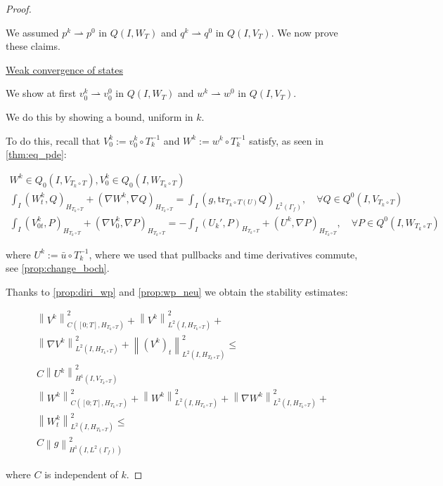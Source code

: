 \documentclass[english,a4paper,10pt,oneside]{scrbook}	%
\theoremstyle{break}
\newenvironment{mproof}[1][\proofname]{%
  \begin{proof}[#1]$ $\par\nobreak\ignorespaces
}{%
  \end{proof}
}
\renewcommand*{\proofname}{Proof}
\theoremstyle{remark}
\newcommand{\norm}[1]{\left\lVert#1\right\rVert}
\newcommand{\tr}{\text{tr}}
\newcommand{\weakc}{\rightharpoonup}
\begin{document}
\begin{mproof}
We assumed $p^k \weakc p^0$ in $Q(I,W_T)$ and $q^k \weakc q^0$ in $Q(I,V_T)$. We now prove these claims.

\underline{Weak convergence of states}

We show at first  $v_0^k \weakc v^0_0$ in $Q(I,W_T)$ and $w^k \weakc w^0$ in $Q(I,V_T)$.

We do this by showing a bound, uniform in $k$.

To do this, recall that $V_0^k:=v_0^k\circ T_k^{-1}$ and $W^k:=w^k\circ T_k^{-1}$ satisfy, as seen in \ref{thm:eq_pde}:

\begin{align*}
W^k \in Q_0(I, V_{T_k\circ T}), V_0^k \in Q_0(I,W_{T_k\circ T}) \\
\int_I  (W^k_t , Q)_{H_{T_k\circ T}}+ (\nabla W^k, \nabla Q)_{H_{T_k\circ T}} = \int_I(g,\tr_{{T_k\circ T}(U)} Q)_{L^2(\Gamma_f)}, \quad \forall Q \in Q^0(I, V_{T_k\circ T}) \\
\int_I (V^k_{0t},P)_{H_{T_k\circ T}} + (\nabla V_0^k, \nabla P)_{H_{T_k\circ T}}= -\int_I(U_k',P)_{H_{T_k\circ T}}+(U^k, \nabla P)_{H_{T_k\circ T}}, \quad \forall P \in Q^0(I, W_{T_k\circ T})
\end{align*}

where $U^k:=\bar{u}\circ T_k^{-1}$, where we used that pullbacks and time derivatives commute, see \cref{prop:change_boch}.

Thanks to \cref{prop:diri_wp} and \cref{prop:wp_neu} we obtain the stability estimates:

\begin{align*}
\norm{V^k}^2_{C([0;T],H_{T_k\circ T})}+\norm{V^k}_{L^2(I,H_{T_k\circ T})}^2+ \\\norm{\nabla V^k}_{L^2(I,H_{T_k\circ T})}^2 + \norm{(V^k)_t}^2_{L^2(I,H_{T_k\circ T})}\leq\\ C\norm{U^k}_{H^1(I,V_{T_k\circ T})}^2\\
\norm{W^k}^2_{C([0;T],H_{T_k\circ T})}+\norm{W^k}_{L^2(I,H_{T_k\circ T})}^2+ \norm{\nabla W^k}_{L^2(I,H_{T_k\circ T})}^2 +\\ \norm{W^k_t}^2_{L^2(I,H_{T_k\circ T})}\leq \\C\norm{g}_{H^1(I,L^2(\Gamma_f))}^2
\end{align*}


where $C$ is independent of $k$.



\end{mproof}
\end{document}
